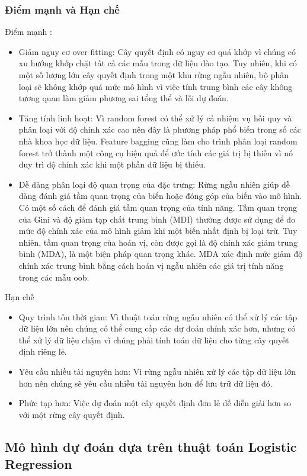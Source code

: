 \begin{enumerate}
\subsubsection{Điểm mạnh và Hạn chế}
Điểm mạnh : 
\begin{itemize}
    \item {Giảm nguy cơ over fitting:} Cây quyết định có nguy cơ quá khớp vì chúng có xu hướng khớp chặt tất cả các mẫu trong dữ liệu đào tạo. Tuy nhiên, khi có một số lượng lớn cây quyết định trong một khu rừng ngẫu nhiên, bộ phân loại sẽ không khớp quá mức mô hình vì việc tính trung bình các cây không tương quan làm giảm phương sai tổng thể và lỗi dự đoán.
    \item {Tăng tính linh hoạt:} Vì random forest có thể xử lý cả nhiệm vụ hồi quy và phân loại với độ chính xác cao nên đây là phương pháp phổ biến trong số các nhà khoa học dữ liệu. Feature bagging cũng làm cho trình phân loại random forest trở thành một công cụ hiệu quả để ước tính các giá trị bị thiếu vì nó duy trì độ chính xác khi một phần dữ liệu bị thiếu.
    \item {Dễ dàng phân loại độ quan trọng của đặc trưng:} Rừng ngẫu nhiên giúp dễ dàng đánh giá tầm quan trọng của biến hoặc đóng góp của biến vào mô hình. Có một số cách để đánh giá tầm quan trọng của tính năng. Tầm quan trọng của Gini và độ giảm tạp chất trung bình (MDI) thường được sử dụng để đo mức độ chính xác của mô hình giảm khi một biến nhất định bị loại trừ. Tuy nhiên, tầm quan trọng của hoán vị, còn được gọi là độ chính xác giảm trung bình (MDA), là một biện pháp quan trọng khác. MDA xác định mức giảm độ chính xác trung bình bằng cách hoán vị ngẫu nhiên các giá trị tính năng trong các mẫu oob.
\end{itemize}
Hạn chế
\begin{itemize}
    \item {Quy trình tốn thời gian:} Vì thuật toán rừng ngẫu nhiên có thể xử lý các tập dữ liệu lớn nên chúng có thể cung cấp các dự đoán chính xác hơn, nhưng có thể xử lý dữ liệu chậm vì chúng phải tính toán dữ liệu cho từng cây quyết định riêng lẻ.
    \item {Yêu cầu nhiều tài nguyên hơn:} Vì rừng ngẫu nhiên xử lý các tập dữ liệu lớn hơn nên chúng sẽ yêu cầu nhiều tài nguyên hơn để lưu trữ dữ liệu đó.
    \item {Phức tạp hơn:} Việc dự đoán một cây quyết định đơn lẻ dễ diễn giải hơn so với một rừng cây quyết định.
\end{itemize}
\subsection{Mô hình dự đoán dựa trên thuật toán Logistic Regression}

\end{enumerate}
